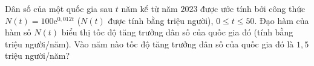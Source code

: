 \begin{bt}%
Dân số của một quốc gia sau $ t $ năm kể từ năm $ 2023 $ được ước tính bởi công thức $ N(t)=100\mathrm{e}^{0{,}012t} $ ($ N(t) $ được tính bằng triệu người), $ 0\le t\le 50 $. Đạo hàm của hàm số $ N(t) $ biểu thị tốc độ tăng trưởng dân số của quốc gia đó (tính bằng triệu người/năm). Vào năm nào tốc độ tăng trưởng dân số của quốc gia đó là $ 1{,}5 $ triệu người/năm?

\end{bt}

